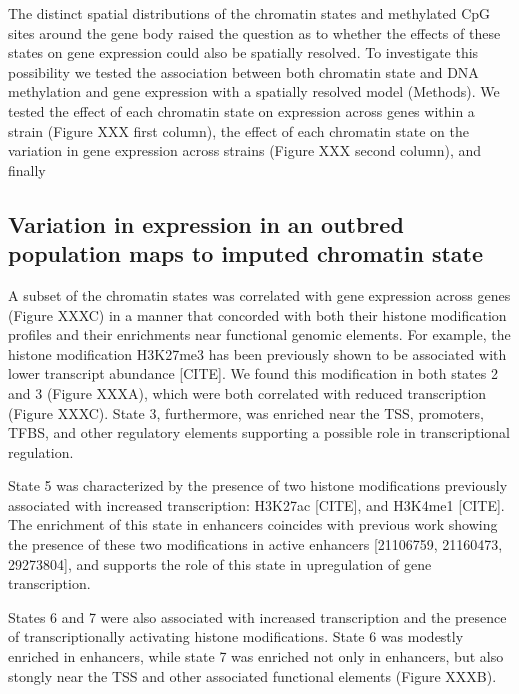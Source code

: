 \documentclass[10pt,letterpaper]{article}
\begin{document}
The distinct spatial distributions of the chromatin states and
methylated CpG sites around the gene body raised the question as to
whether the effects of these states on gene expression could also be
spatially resolved. To investigate this possibility we tested the
association between both chromatin state and DNA methylation and gene
expression with a spatially resolved model (Methods). We tested the
effect of each chromatin state on expression across genes within a
strain (Figure XXX first column), the effect of each chromatin state on
the variation in gene expression across strains (Figure XXX second
column), and finally

\hypertarget{variation-in-expression-in-an-outbred-population-maps-to-imputed-chromatin-state}{%
\subsection{Variation in expression in an outbred population maps to
imputed chromatin
state}\label{variation-in-expression-in-an-outbred-population-maps-to-imputed-chromatin-state}}

A subset of the chromatin states was correlated with gene expression
across genes (Figure XXXC) in a manner that concorded with both their
histone modification profiles and their enrichments near functional
genomic elements. For example, the histone modification H3K27me3 has
been previously shown to be associated with lower transcript abundance
{[}CITE{]}. We found this modification in both states 2 and 3 (Figure
XXXA), which were both correlated with reduced transcription (Figure
XXXC). State 3, furthermore, was enriched near the TSS, promoters, TFBS,
and other regulatory elements supporting a possible role in
transcriptional regulation.

State 5 was characterized by the presence of two histone modifications
previously associated with increased transcription: H3K27ac {[}CITE{]},
and H3K4me1 {[}CITE{]}. The enrichment of this state in enhancers
coincides with previous work showing the presence of these two
modifications in active enhancers {[}21106759, 21160473, 29273804{]},
and supports the role of this state in upregulation of gene
transcription.

States 6 and 7 were also associated with increased transcription and the
presence of transcriptionally activating histone modifications. State 6
was modestly enriched in enhancers, while state 7 was enriched not only
in enhancers, but also stongly near the TSS and other associated
functional elements (Figure XXXB).
\end{document}
